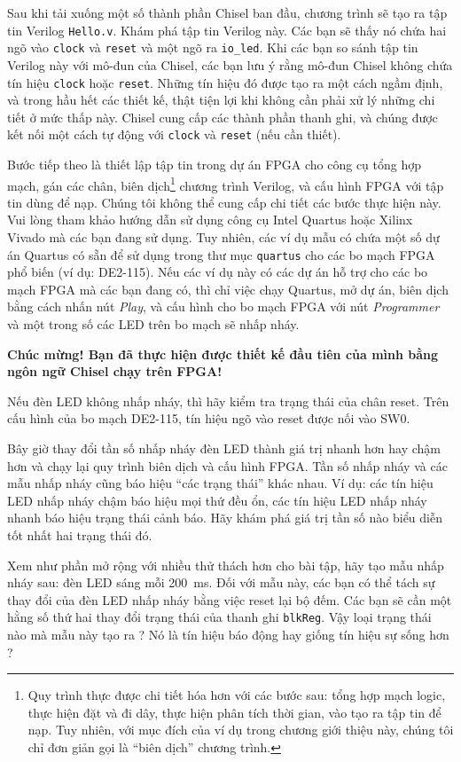 \documentclass[%
    10pt,
    headinclude, footexclude,
    openright, %
    notitlepage,
    cleardoubleempty,
    headsepline,
    pointlessnumbers,
    bibtotoc, idxtotoc,
    ]{scrbook}
\newcommand{\code}[1]{{\small{\texttt{#1}}}}
\begin{document}
Sau khi tải xuống một số thành phần Chisel ban đầu, chương trình sẽ tạo ra tập tin Verilog \code{Hello.v}.
Khám phá tập tin Verilog này. Các bạn sẽ thấy nó chứa hai ngõ vào \code{clock} và \code{reset}
và một ngõ ra \code{io\_led}. Khi các bạn so sánh tập tin Verilog này với mô-đun của Chisel,
các bạn lưu ý rằng mô-đun Chisel không chứa tín hiệu \code{clock} hoặc \code{reset}.
Những tín hiệu đó được tạo ra một cách ngầm định, và trong hầu hết các thiết kế, thật tiện lợi khi không cần 
phải xử lý những chi tiết ở mức thấp này. Chisel cung cấp các thành phần thanh ghi, và chúng 
được kết nối một cách tự động với \code{clock} và \code{reset} (nếu cần thiết).

Bước tiếp theo là thiết lập tập tin trong dự án FPGA cho công cụ tổng hợp mạch, gán các chân,
biên dịch\footnote{Quy trình thực được chi tiết hóa hơn với các bước sau: tổng hợp mạch logic,
thực hiện đặt và đi dây, thực hiện phân tích thời gian, vào tạo ra tập tin để nạp.
Tuy nhiên, với mục đích của ví dụ trong chương giới thiệu này, chúng tôi chỉ đơn giản gọi là ``biên dịch''
chương trình.} chương trình Verilog, và cấu hình FPGA với tập tin dùng để nạp.
Chúng tôi không thể cung cấp chi tiết các bước thực hiện này. Vui lòng tham khảo hướng dẫn sử dụng
công cụ Intel Quartus hoặc Xilinx Vivado mà các bạn đang sử dụng.
Tuy nhiên, các ví dụ mẫu có chứa một số dự án Quartus có sẵn để sử dụng trong thư mục
\code{quartus} cho các bo mạch FPGA phổ biến (ví dụ: DE2-115).
Nếu các ví dụ này có các dự án hỗ trợ cho các bo mạch FPGA mà các bạn đang có, thì chỉ việc chạy Quartus,
mở dự án, biên dịch bằng cách nhấn nút \emph{Play}, và cấu hình cho bo mạch FPGA 
với nút \emph{Programmer} và một trong số các LED trên bo mạch sẽ nhấp nháy.

{\bf Chúc mừng! Bạn đã thực hiện được thiết kế đầu tiên của mình bằng ngôn ngữ Chisel chạy trên FPGA!}

Nếu đèn LED không nhấp nháy, thì hãy kiểm tra trạng thái của chân reset. Trên cấu hình của bo mạch DE2-115, tín hiệu ngõ vào reset được nối vào SW0.

Bây giờ thay đổi tần số nhấp nháy đèn LED thành giá trị nhanh hơn hay chậm hơn và
chạy lại quy trình biên dịch và cấu hình FPGA. Tần số nhấp nháy và các mẫu nhấp nháy 
cũng báo hiệu ``các trạng thái'' khác nhau. Ví dụ: các tín hiệu LED nhấp nháy chậm 
báo hiệu mọi thứ đều ổn, các tín hiệu LED nhấp nháy nhanh báo hiệu trạng thái cảnh báo.
Hãy khám phá giá trị tần số nào biểu diễn tốt  nhất hai trạng thái đó.

Xem như phần mở rộng với nhiều thử thách hơn cho bài tập, hãy tạo mẫu nhấp nháy sau:
đèn LED sáng mỗi 200~ms. Đối với mẫu này, các bạn có thể tách sự thay đổi của đèn LED
nhấp nháy bằng việc reset lại bộ đếm. Các bạn sẽ cần một hằng số thứ hai thay đổi trạng thái của
thanh ghi \code{blkReg}. Vậy loại trạng thái nào mà mẫu này tạo ra ?
Nó là tín hiệu báo động hay giống tín hiệu sự sống hơn ?
\end{document}
